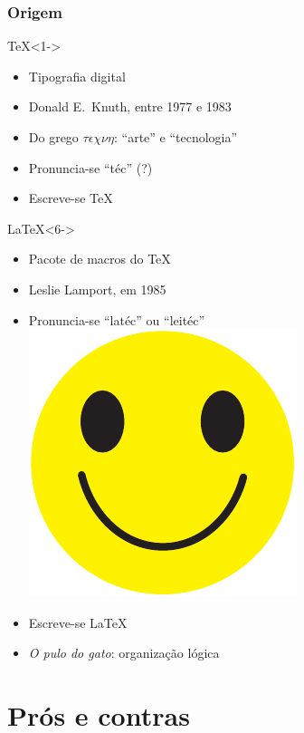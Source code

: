 \documentclass[handout]{beamer}
\begin{document}
\begin{frame}[shrink=1]
	\frametitle{Origem}
		
	\begin{block}{\TeX}<1->
		\begin{minipage}[t]{0.7\textwidth}
			\begin{itemize}
				\item<1-> Tipografia digital
				\item<2-> Donald E.~Knuth, entre 1977 e 1983
				\item<3-> Do grego {$\tau\epsilon\chi\nu\eta$}: ``arte'' e ``tecnologia''
				\item<4-> Pronuncia-se ``téc'' (?)
				\item<5-> Escreve-se \textsf{TeX}
			\end{itemize}
		\end{minipage}\hfill
		\begin{minipage}{0.2\textwidth}
		\end{minipage}
	\end{block}
	
	\begin{block}{\LaTeX}<6->
		\begin{minipage}[t]{0.7\textwidth}
			\begin{itemize}
				\item<6-> Pacote de macros do \TeX
				\item<7-> Leslie \alert<7>{La}mport, em 1985
				\item<8-> Pronuncia-se ``latéc'' ou ``leitéc'' \quad \hyperlink{engracado}{\includegraphics[width=2ex]{smiley}}
				\item<9-> Escreve-se \textsf{LaTeX}
				\item<10-> \emph{O pulo do gato}: organização lógica
			\end{itemize}
		\end{minipage}\hfill
		\begin{minipage}{0.2\textwidth}
		\end{minipage}		
	\end{block}	
\end{frame}

\section{Prós e contras}
\end{document}

